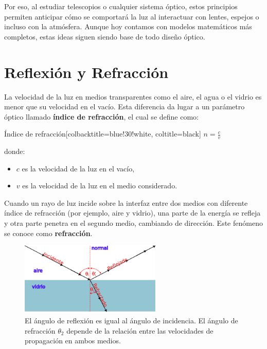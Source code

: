 Por eso, al estudiar telescopios o cualquier sistema óptico, estos principios permiten anticipar cómo se comportará la luz al interactuar con lentes, espejos o incluso con la atmósfera. Aunque hoy contamos con modelos matemáticos más completos, estas ideas siguen siendo base de todo diseño óptico.


\section{Reflexión y Refracción}

La velocidad de la luz en medios transparentes como el aire, el agua o el vidrio es menor que su velocidad en el vacío. Esta diferencia da lugar a un parámetro óptico llamado \textbf{índice de refracción}, el cual se define como:

\begin{mybox}[blue]{Índice de refracción}[colbacktitle=blue!30!white, coltitle=black]
	$n = \frac{c}{v}$
\end{mybox}

donde:
\begin{itemize}
	\item $c$ es la velocidad de la luz en el vacío,
	\item $v$ es la velocidad de la luz en el medio considerado.
\end{itemize}

Cuando un rayo de luz incide sobre la interfaz entre dos medios con diferente índice de refracción (por ejemplo, aire y vidrio), una parte de la energía se refleja y otra parte penetra en el segundo medio, cambiando de dirección. Este fenómeno se conoce como \textbf{refracción}.

\begin{figure}[H]		
	\centering
	\includegraphics[width=0.6\textwidth]{images/refraction_reflection.png}
	\caption{El ángulo de reflexión es igual al ángulo de incidencia. El ángulo de refracción $\theta_2$ depende de la relación entre las velocidades de propagación en ambos medios.}
	\label{fig:refraccón_reflexión_planos}
\end{figure} 

